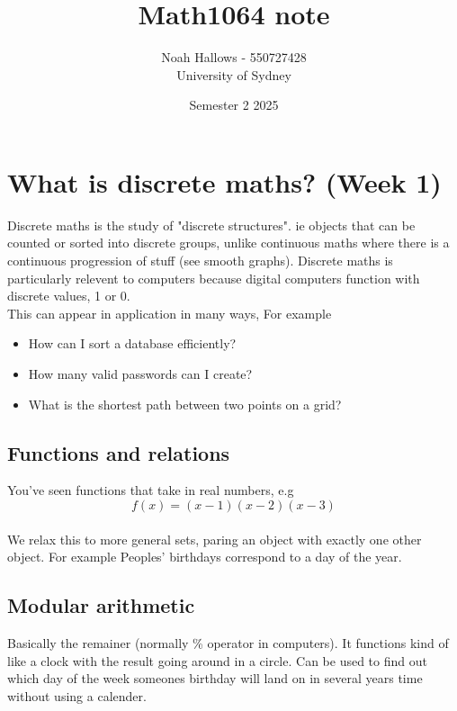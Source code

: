 \documentclass[a4paper, 11pt]{report}
\title{Math1064 note \\ }
\author{Noah Hallows - 550727428 \\ University of Sydney}
\date{Semester 2 2025}
\begin{document}
    \begin{titlepage}
    \maketitle
    \end{titlepage}

    \tableofcontents

    \newpage
    \section{What is discrete maths? (Week 1)}
	Discrete maths is the study of "discrete structures". ie objects that can be counted or sorted into discrete groups, unlike continuous maths where there is a continuous progression of stuff (see smooth graphs). Discrete maths is particularly relevent to computers because digital computers function with discrete values, 1 or 0.\\
	This can appear in application in many ways, For example\\
	\begin{itemize}
		\item How can I sort a database efficiently?
		\item How many valid passwords can I create?
		\item What is the shortest path between two points on a grid?
	\end{itemize}
	\subsection{Functions and relations}
	You've seen functions that take in real numbers, e.g \[f(x) = (x-1)(x-2)(x-3)\] \\
	We relax this to more general sets, paring an object with exactly one other object. For example Peoples' birthdays correspond to a day of the year.
	\subsection{Modular arithmetic}
	Basically the remainer (normally \% operator in computers). It functions kind of like a clock with the result going around in a circle. Can be used to find out which day of the week someones birthday will land on in several years time without using a calender.
\end{document}
